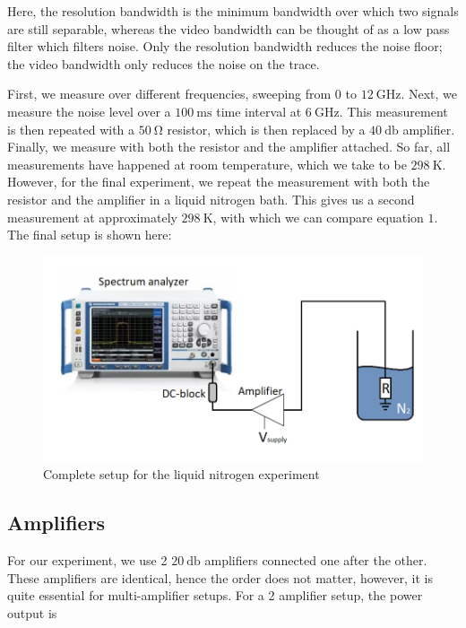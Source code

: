 \documentclass[english,12pt,a4paper]{article}
\begin{document}
Here, the resolution bandwidth is the minimum bandwidth over which two signals are still separable, whereas the video bandwidth can be thought of as a low pass filter which filters noise. Only the resolution bandwidth reduces the noise floor; the video bandwidth only reduces the noise on the trace.

First, we measure over different frequencies, sweeping from $0$ to  $\qty{12}{\giga\hertz}$. Next, we measure the noise level over a $\qty{100}{\milli\second}$ time interval at $\qty{6}{\giga\hertz}$. This measurement is then repeated with a $\qty{50}{\ohm}$ resistor, which is then replaced by a $\qty{40}{\decibel}$ amplifier. Finally, we measure with both the resistor and the amplifier attached. So far, all measurements have happened at room temperature, which we take to be $\qty{298}{\kelvin}$. However, for the final experiment, we repeat the measurement with both the resistor and the amplifier in a liquid nitrogen bath. This gives us a second measurement at approximately $\qty{298}{\kelvin}$, with which we can compare equation $1$. The final setup is shown here:

\begin{figure}[H]
	\includegraphics[width=1\linewidth]{PHYS_C0258_Noise_measurements}
	\caption{Complete setup for the liquid nitrogen experiment}
	\label{fig:physc0258noisemeasurements}
\end{figure}
 
 \subsection{Amplifiers}
 
 For our experiment, we use 2 $\qty{20}{\decibel}$ amplifiers connected one after the other. These amplifiers are identical, hence the order does not matter, however, it is quite essential for multi-amplifier setups. For a 2 amplifier setup, the power output is 
 
\end{document}
